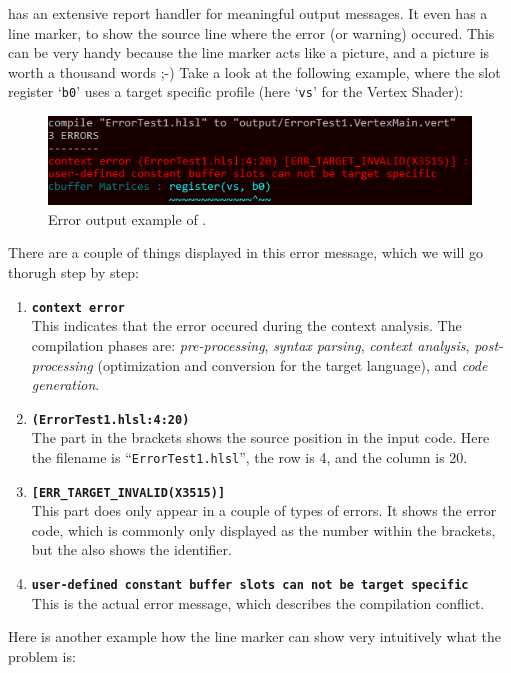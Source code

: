 \documentclass{article}
\begin{document}
\XSC has an extensive report handler for meaningful output messages.
It even has a line marker, to show the source line where the error (or warning) occured.
This can be very handy because the line marker acts like a picture, and a picture is worth a thousand words ;-)
Take a look at the following example, where the slot register `\texttt{b0}' uses a target specific profile
(here `\texttt{vs}' for the Vertex Shader):
\begin{figure}[H]
	\centering
	\includegraphics{images/error_output1}
	\caption{Error output example of \XSC.}
	\label{fig:error_output1}
\end{figure}
There are a couple of things displayed in this error message, which we will go thorugh step by step:
\begin{enumerate}
	\item \textbf{\texttt{context error}} \\
	This indicates that the error occured during the context analysis. The compilation phases are:
	\emph{pre-processing}, \emph{syntax parsing}, \emph{context analysis},
	\emph{post-processing} (optimization and conversion for the target language), and \emph{code generation}.
	
	\item \textbf{\texttt{(ErrorTest1.hlsl:4:20)}} \\
	The part in the brackets shows the source position in the input code.
	Here the filename is ``\texttt{ErrorTest1.hlsl}'', the row is 4, and the column is 20.
	
	\item \textbf{\texttt{[ERR\_TARGET\_INVALID(X3515)]}} \\
	This part does only appear in a couple of types of errors. It shows the error code, which is commonly only
	displayed as the number within the brackets, but the \XSC also shows the identifier.
	
	\item \textbf{\texttt{user-defined constant buffer slots can not be target specific}} \\
	This is the actual error message, which describes the compilation conflict.
\end{enumerate}
Here is another example how the line marker can show very intuitively what the problem is:
\end{document}
